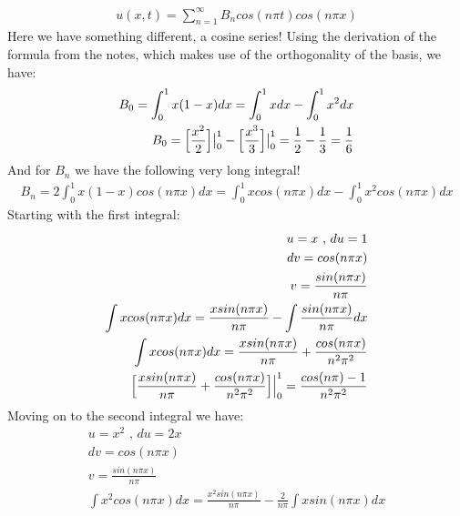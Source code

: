 \documentclass{article}
\begin{document}
\begin{equation}
\begin{aligned}
u(x,t) = \sum_{n=1}^{\infty}B_ncos(n\pi t)cos(n\pi x)
\end{aligned}
\end{equation}
Here we have something different, a cosine series! Using the derivation of the formula from the notes, which makes use of the orthogonality of the basis, we have:
\begin{equation}
\begin{aligned}
B_0 = \int_0^1x(1-x)dx = \int_0^1xdx - \int^1_0x^2dx\\
B_0 = \Big{[}\frac{x^2}{2} \Big{]}\big{|}_0^1 - \Big{[}\frac{x^3}{3} \Big{]}\big{|}_0^1 = \frac{1}{2} - \frac{1}{3} = \frac{1}{6}
\end{aligned}
\end{equation}
And for $B_n$ we have the following very long integral!
\begin{equation}
\begin{aligned}
B_n = 2\int_0^1x(1-x)cos(n\pi x)dx=\int_0^1xcos(n\pi x)dx - \int_0^1x^2cos(n\pi x)dx
\end{aligned}
\end{equation}
Starting with the first integral:
\begin{equation}
\begin{aligned}
u = x \text{ , } du = 1\\
dv = cos(n\pi x)\\
v = \frac{sin(n\pi x)}{n\pi}\\
\int xcos(n\pi x)dx = \frac{xsin(n\pi x)}{n\pi} - \int\frac{sin(n\pi x)}{n\pi}dx\\
\int xcos(n\pi x)dx = \frac{xsin(n\pi x)}{n\pi} + \frac{cos(n\pi x)}{n^2\pi^2}\\
\Big{[} \frac{xsin(n\pi x)}{n\pi} + \frac{cos(n\pi x)}{n^2\pi^2} \Big{]}\Big{|}_0^1 = \frac{cos(n\pi) - 1}{n^2\pi^2}
\end{aligned}
\end{equation}
Moving on to the second integral we have:
\begin{equation}
\begin{aligned}
u = x^2 \text{ , } du = 2x\\
dv = cos(n\pi x)\\
v = \frac{sin(n\pi x)}{n\pi}\\
\int x^2cos(n\pi x)dx = \frac{x^2sin(n\pi x)}{n\pi} - \frac{2}{n\pi}\int xsin(n\pi x)dx
\end{aligned}
\end{equation}
\end{document}

